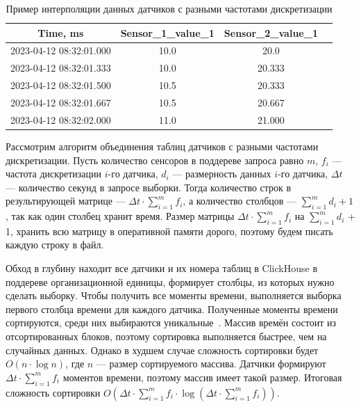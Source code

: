 \begin{table}
  \caption{Пример интерполяции данных датчиков с разными частотами дискретизации}
  \fontsize{12pt}{18pt}\selectfont
  \begin{tabular}{|c|c|c|c|}\hline
    \textbf{Time, ms}       & \textbf{Sensor\_1\_value\_1} & \textbf{Sensor\_2\_value\_1} \\ \hline
    2023-04-12 08:32:01.000 & 10.0                         & 20.0                         \\ \hline
    2023-04-12 08:32:01.333 & 10.0                         & 20.333                       \\ \hline
    2023-04-12 08:32:01.500 & 10.5                         & 20.333                       \\ \hline
    2023-04-12 08:32:01.667 & 10.5                         & 20.667                       \\ \hline
    2023-04-12 08:32:02.000 & 11.0                         & 21.000                       \\ \hline
  \end{tabular}
  \label{sample2}
\end{table}




Рассмотрим алгоритм объединения таблиц датчиков с разными частотами дискретизации. Пусть количество сенсоров в поддереве запроса равно $m$, $f_i$ --- частота дискретизации $i$-го датчика, $d_i$ --- размерность данных $i$-го датчика, ${\Delta}t$ --- количество секунд в запросе выборки. Тогда количество строк в результирующей матрице --- ${\Delta}t \cdot \sum^{m}_{i=1}{f_i}$, а количество столбцов --- $\sum^{m}_{i=1}{d_i} + 1$, так как один столбец хранит время. Размер матрицы ${\Delta}t \cdot \sum^{m}_{i=1}{f_i} $ на $\sum^{m}_{i=1}{d_i}$ + 1, хранить всю матрицу в оперативной памяти дорого, поэтому будем писать каждую строку в файл.

Обход в глубину находит все датчики и их номера таблиц в ClickHouse в поддереве организационной единицы, формирует столбцы, из которых нужно сделать выборку. Чтобы получить все моменты времени, выполняется выборка первого столбца времени для каждого датчика. Полученные моменты времени сортируются, среди них выбираются уникальные~\cite{np-unique}. Массив времён состоит из отсортированных блоков, поэтому сортировка выполняется быстрее, чем на случайных данных. Однако в худшем случае сложность сортировки будет $O(n \cdot \log{n})$, где $n$ --- размер сортируемого массива. Датчики формируют ${\Delta}t \cdot \sum^{m}_{i=1}{f_i}$ моментов времени, поэтому массив имеет такой размер. Итоговая сложность сортировки $O({\Delta}t \cdot \sum^{m}_{i=1}{f_i} \cdot \log{({\Delta}t \cdot \sum^{m}_{i=1}{f_i})})$.

